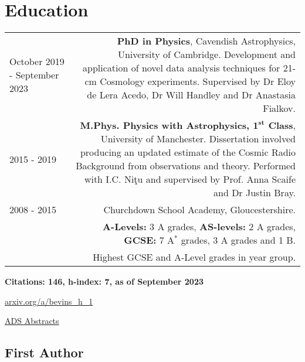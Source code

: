 \documentclass{article}
\begin{document}
\section*{Education}
\begin{tabular}{L!{\vrule}R}
	October 2019 - September 2023 & \textbf{PhD in Physics}, Cavendish Astrophysics, University of Cambridge. Development and application of novel data analysis techniques for 21-cm Cosmology experiments. Supervised by Dr Eloy de Lera Acedo, Dr Will Handley and Dr Anastasia Fialkov. \\
	2015 - 2019 & \textbf{M.Phys. Physics with Astrophysics, $\mathbf{1^{st}}$ Class}, University of Manchester. Dissertation involved producing an updated estimate of the Cosmic Radio Background from observations and theory. Performed with I.C. Ni\c{t}u and supervised by Prof. Anna Scaife and Dr Justin Bray. \\
	2008 - 2015 & Churchdown School Academy, Gloucestershire. \\ &\textbf{A-Levels:} 3 A grades, \textbf{AS-levels:} 2 A grades, \textbf{GCSE:} 7 A$^*$ grades, 3 A grades and 1 B. \\ & Highest GCSE and A-Level grades in year group.
\end{tabular}

 \hfill \textbf{Citations: 146, h-index: 7, as of September 2023}

\hfill \href{http://arxiv.org/a/bevins_h_1}{arxiv.org/a/bevins\_h\_1}

\hfill \href{https://ui.adsabs.harvard.edu/search/p_=0&q=author\%3A\%22Bevins\%2C\%20H.\%20T.\%20J.\%22&sort=date\%20desc\%2C\%20bibcode\%20desc}{ADS Abstracts}

\subsection*{First Author}
\end{document}
